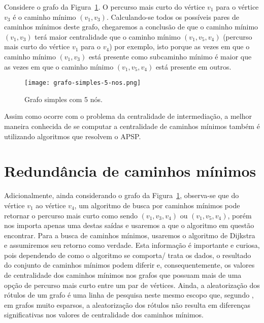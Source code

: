 Considere o grafo da Figura~\ref{sec3:grafo-simples-5-nos}. O percurso mais curto do vértice $v_1$ para o vértice $v_3$ é o caminho mínimo $(v_1, v_3)$. Calculando-se todos os possíveis pares de caminhos mínimos deste grafo, chegaremos a conclusão de que o caminho mínimo $(v_1, v_3)$ terá maior centralidade que o caminho mínimo $(v_1, v_5, v_4)$ (percurso mais curto do vértice $v_1$ para o $v_4$) por exemplo, isto porque as vezes em que o caminho mínimo $(v_1, v_3)$ está presente como subcaminho mínimo é maior que as vezes em que o caminho mínimo $(v_1, v_5, v_4)$ está presente em outros.

\begin{figure}[!htb]
    \centering
	\texttt{[image: grafo-simples-5-nos.png]}
    \caption{Grafo simples com 5 nós.}
    \label{sec3:grafo-simples-5-nos}
\end{figure}

Assim como ocorre com o problema da centralidade de intermediação, a melhor maneira conhecida de se computar a centralidade de caminhos mínimos também é utilizando algoritmos que resolvem o APSP.

\section{Redundância de caminhos mínimos}
Adicionalmente, ainda considerando o grafo da Figura~\ref{sec3:grafo-simples-5-nos}, observa-se que do vértice $v_1$ ao vértice $v_4$, um algoritmo de busca por caminhos mínimos pode retornar o percurso mais curto como sendo $(v_1, v_3, v_4)$ ou $(v_1, v_5, v_4)$, porém nos importa apenas uma destas saídas e usaremos a que o algoritmo em questão encontrar. Para a busca de caminhos mínimos, usaremos o algoritmo de Dijkstra e assumiremos seu retorno como verdade. Esta informação é importante e curiosa, pois dependendo de como o algoritmo se comporta/ trata os dados, o resultado do conjunto de caminhos mínimos podem diferir e, consequentemente, os valores de centralidade dos caminhos mínimos nos grafos que possuam mais de uma opção de percurso mais curto entre um par de vértices. Ainda, a aleatorização dos rótulos de um grafo é uma linha de pesquisa neste mesmo escopo que, segundo \cite{alane2021}, em grafos muito esparsos, a aleatorização dos rótulos não resulta em diferenças significativas nos valores de centralidade dos caminhos mínimos.